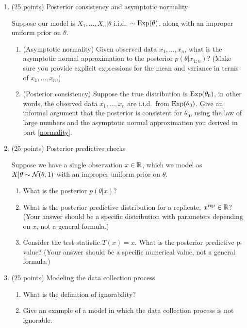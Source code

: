 \documentclass[12pt]{article}
\begin{document}
\normalsize

\newpage
\begin{enumerate}
\item (25 points) Posterior consistency and asymptotic normality

Suppose our model is $X_1,\ldots,X_n | \theta$ i.i.d.\ $\sim \operatorname*{Exp}(\theta)$, along with an improper uniform prior on $\theta$. 
\begin{enumerate}
\setlength\itemsep{20em}
\item\label{normality} (Asymptotic normality) Given observed data $x_1,\ldots,x_n$, what is the asymptotic normal approximation to the posterior $p(\theta | x_{1:n})$?  (Make sure you provide explicit expressions for the mean and variance in terms of $x_1,\ldots,x_n$.)
\item (Posterior consistency) Suppose the true distribution is $\operatorname*{Exp}(\theta_0)$, in other words, the observed data $x_1,\ldots,x_n$ are i.i.d.\ from $\operatorname*{Exp}(\theta_0)$. Give an informal argument that the posterior is consistent for $\theta_0$, using the law of large numbers and the asymptotic normal approximation you derived in part \ref{normality}.
\end{enumerate}




\newpage
\item (25 points) Posterior predictive checks

Suppose we have a single observation $x\in\mathbb{R}$, which we model as $X | \theta \sim \mathcal{N}(\theta,1)$ with an improper uniform prior on $\theta$. 
\begin{enumerate}
\setlength\itemsep{14em}
\item What is the posterior $p(\theta | x)$?
\item What is the posterior predictive distribution for a replicate, $x^\text{rep} \in \mathbb{R}$? (Your answer should be a specific distribution with parameters depending on $x$, not a general formula.)
\item Consider the test statistic $T(x) = x$. What is the posterior predictive p-value? (Your answer should be a specific numerical value, not a general formula.)
\end{enumerate}



\newpage
\item (25 points) Modeling the data collection process

\begin{enumerate}
\setlength\itemsep{10em}
\item What is the definition of ignorability?
\item Give an example of a model in which the data collection process is not ignorable.
\end{enumerate}






\end{enumerate}
\end{document}
